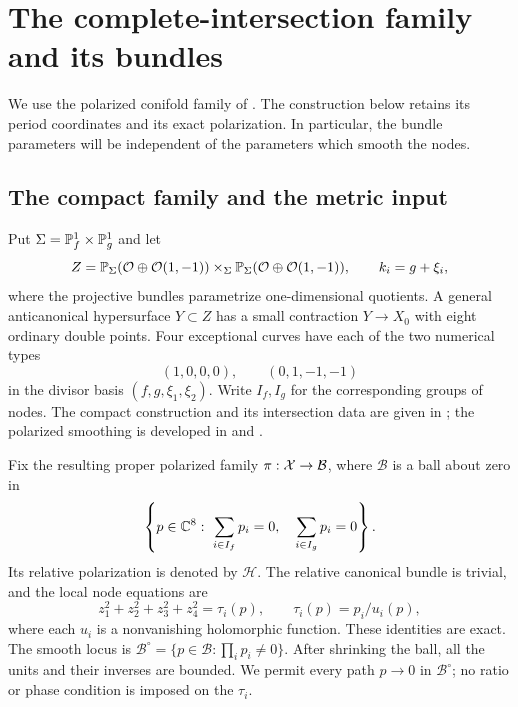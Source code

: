 \section{The complete-intersection family and its bundles}
\label{sec:geometry}

We use the polarized conifold family of \cite[Section 2]{W_Hodge}.
The construction below retains its period coordinates and its exact
polarization. In particular, the bundle parameters will be independent
of the parameters which smooth the nodes.

\subsection{The compact family and the metric input}

Put $\Sigma=\mathbb P^1_f\times\mathbb P^1_g$ and let
\[
 Z=\mathbb P_\Sigma(\mathcal O\oplus\mathcal O(1,-1))
       \times_\Sigma\mathbb P_\Sigma(\mathcal O\oplus\mathcal O(1,-1)),
 \qquad k_i=g+\xi_i,
\]
where the projective bundles parametrize one-dimensional quotients.
A general anticanonical hypersurface $Y\subset Z$ has a small
contraction $Y\to X_0$ with eight ordinary double points. Four
exceptional curves have each of the two numerical types
\[
 (1,0,0,0),\qquad(0,1,-1,-1)
\]
in the divisor basis $(f,g,\xi_1,\xi_2)$. Write $I_f,I_g$ for the
corresponding groups of nodes. The compact construction and its
intersection data are given in \cite[Appendix A]{W_Toric}; the
polarized smoothing is developed in \cite[Section 8]{W_HodgeRay}
and \cite[Section 2]{W_Hodge}.

Fix the resulting proper polarized family $\pi:\mathcal X\to\mathcal B$,
where $\mathcal B$ is a ball about zero in
\begin{equation}\label{eq:period-base}
 \left\{p\in\mathbb C^8:\ \sum_{i\in I_f}p_i=0,
                         \quad\sum_{i\in I_g}p_i=0\right\}.
\end{equation}
Its relative polarization is denoted by $\mathcal H$. The relative
canonical bundle is trivial, and the local node equations are
\begin{equation}\label{eq:node-functions}
 z_1^2+z_2^2+z_3^2+z_4^2=\tau_i(p),\qquad
 \tau_i(p)=p_i/u_i(p),
\end{equation}
where each $u_i$ is a nonvanishing holomorphic function. These
identities are exact. The smooth locus is
$\mathcal B^\circ=\{p\in\mathcal B:\prod_i p_i\ne0\}$.
After shrinking the ball, all the units and their inverses are
bounded. We permit every path $p\to0$ in $\mathcal B^\circ$;
no ratio or phase condition is imposed on the $\tau_i$.

